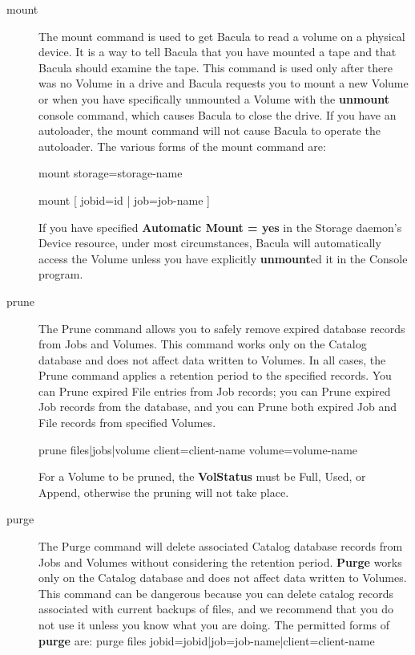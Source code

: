 \begin{description}
\item [mount]
   The mount command is used to get Bacula to  read a volume on a physical
device. It is a way to tell  Bacula that you have mounted a tape and that
Bacula should  examine the tape. This command is used only after there was  no
Volume in a drive and Bacula requests you to mount a new  Volume or when you
have specifically unmounted a Volume with  the {\bf unmount} console command,
which causes Bacula to  close the drive. If you have an autoloader, the mount 
command will not cause Bacula to operate the autoloader. The  various forms of
the mount command are:

mount  storage=\lt{}storage-name\gt{}

mount [ jobid=\lt{}id\gt{} |  job=\lt{}job-name\gt{} ]

If you have specified {\bf Automatic  Mount = yes} in the Storage daemon's
Device resource,  under most circumstances, Bacula will automatically access 
the Volume unless you have explicitly {\bf unmount}ed it in  the Console
program. 
\label{ManualPruning}

\item [prune]
   The Prune command allows you to safely  remove expired database records from
Jobs and Volumes.  This command works only on the Catalog database and does
not  affect data written to Volumes. In all  cases, the Prune command applies
a retention period to the  specified records. You can Prune expired File
entries from  Job records; you can Prune expired Job records from the 
database, and you can Prune both expired Job and File records  from specified
Volumes.  

prune files|jobs|volume client=\lt{}client-name\gt{} 
volume=\lt{}volume-name\gt{}  

For a Volume to be pruned, the {\bf VolStatus}  must be Full, Used, or Append,
otherwise the pruning will not  take place.  

\item [purge]
   The Purge command will delete associated  Catalog database  records from Jobs
and Volumes without considering the  retention period. {\bf Purge} works only
on the Catalog database  and does not affect data written to Volumes.  This
command can be dangerous because you  can delete catalog records associated
with current backups of  files, and we recommend  that you do not use it
unless you know what you are doing.  The permitted forms of {\bf purge} are: 
purge files
jobid=\lt{}jobid\gt{}|job=\lt{}job-name\gt{}|client=\lt{}client-name\gt{} 


\end{description}
